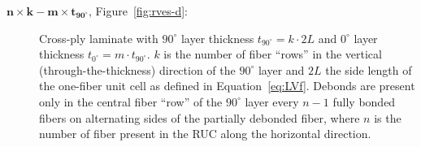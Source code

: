 \documentclass[12pt,a4paper]{article}
\begin{document}
\begin{description}
\item [$\mathbf{n\times k-m\times t_{90^{\circ}}}$, Figure~\ref{fig:rves-d}: ]Cross-ply laminate with $90^{\circ}$ layer thickness $t_{90^{\circ}}=k\cdot2L$ and $0^{\circ}$ layer thickness $t_{0^{\circ}}=m\cdot t_{90^{\circ}}$. $k$ is the number of fiber ``rows'' in the vertical (through-the-thickness) direction of the $90^{\circ}$ layer and $2L$ the side length of the one-fiber unit cell as defined in Equation~\ref{eq:LVf}. Debonds are present only in the central fiber ``row'' of the $90^{\circ}$ layer every $n-1$ fully bonded fibers on alternating sides of the partially debonded fiber, where $n$ is the number of fiber present in the RUC along the horizontal direction.
\end{description}

\begin{figure}[!h]
\centering
    \quad 
    \\
    \quad

\end{figure}
\end{document}
